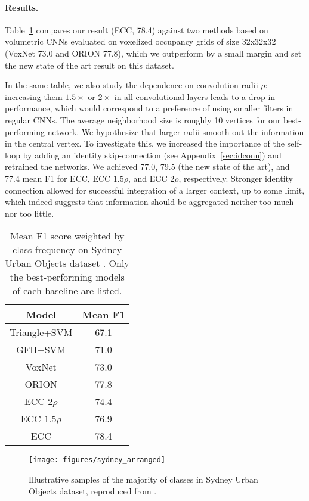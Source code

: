 \documentclass[10pt,twocolumn,letterpaper]{article}
\begin{document}
\paragraph*{Results.} 
Table~\ref{tab:respc} compares our result (ECC, 78.4) against two methods based on volumetric CNNs evaluated on voxelized occupancy grids of size 32x32x32 (VoxNet \cite{voxnet} 73.0 and ORION \cite{orion} 77.8), which we outperform by a small margin and set the new state of the art result on this dataset. 

In the same table, we also study the dependence on convolution radii $\rho$: increasing them $1.5\times$ or $2\times$ in all convolutional layers leads to a drop in performance, which would correspond to a preference of using smaller filters in regular CNNs. The average neighborhood size is roughly 10 vertices for our best-performing network.
We hypothesize that larger radii smooth out the information in the central vertex. 
To investigate this, we increased the importance of the self-loop by adding an identity skip-connection (see Appendix~\ref{sec:idconn}) and retrained the networks. We achieved 77.0, 79.5 (the new state of the art), and 77.4 mean F1 for ECC, ECC $1.5\rho$, and ECC $2\rho$, respectively. Stronger identity connection allowed for successful integration of a larger context, up to some limit, which indeed suggests that information should be aggregated neither too much nor too little.


\begin{table}[bt]
\centering
\begin{tabular}{cc}
\toprule
Model & Mean F1\tabularnewline
\midrule
Triangle+SVM \cite{trianglesvm}& 67.1 \tabularnewline
GFH+SVM \cite{gfhsvm} & 71.0 \tabularnewline
VoxNet \cite{voxnet} & 73.0 \tabularnewline
ORION \cite{orion} & 77.8\tabularnewline
\midrule
ECC $2\rho$ & 74.4 \tabularnewline
ECC $1.5\rho$ & 76.9 \tabularnewline
ECC & 78.4\tabularnewline
\bottomrule
\end{tabular}
\vspace{1.5ex}
\caption{\label{tab:respc}
Mean F1 score weighted by class frequency on Sydney Urban Objects dataset \cite{trianglesvm}. Only the best-performing models of each baseline are listed.}
\end{table}

\begin{figure}[bt]
\centering
\texttt{[image: figures/sydney\_arranged]}
\vspace{1.5ex}
\caption{\label{fig:sydney} Illustrative samples of the majority of classes in Sydney Urban Objects dataset, reproduced from \cite{trianglesvm}.}
\end{figure}
\end{document}
